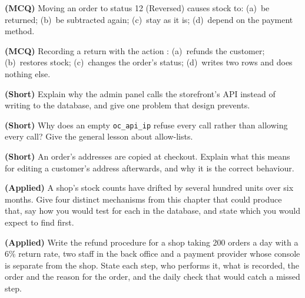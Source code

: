 \begin{reviewq}
  \item \textbf{(MCQ)} Moving an order to status 12 (Reversed) causes stock to:
        (a)~be returned; (b)~be subtracted again; (c)~stay as it is;
        (d)~depend on the payment method.
  \item \textbf{(MCQ)} Recording a return with the action :
        (a)~refunds the customer; (b)~restores stock; (c)~changes the order's
        status; (d)~writes two rows and does nothing else.
  \item \textbf{(Short)} Explain why the admin panel calls the storefront's API
        instead of writing to the database, and give one problem that design
        prevents.
  \item \textbf{(Short)} Why does an empty \texttt{oc\_api\_ip} refuse every
        call rather than allowing every call? Give the general lesson about
        allow-lists.
  \item \textbf{(Short)} An order's addresses are copied at checkout. Explain
        what this means for editing a customer's address afterwards, and why it
        is the correct behaviour.
  \item \textbf{(Applied)} A shop's stock counts have drifted by several hundred
        units over six months. Give four distinct mechanisms from this chapter
        that could produce that, say how you would test for each in the
        database, and state which you would expect to find first.
  \item \textbf{(Applied)} Write the refund procedure for a shop taking 200
        orders a day with a 6\% return rate, two staff in the back office and a
        payment provider whose console is separate from the shop. State each
        step, who performs it, what is recorded, the order and the reason for
        the order, and the daily check that would catch a missed step.
\end{reviewq}
